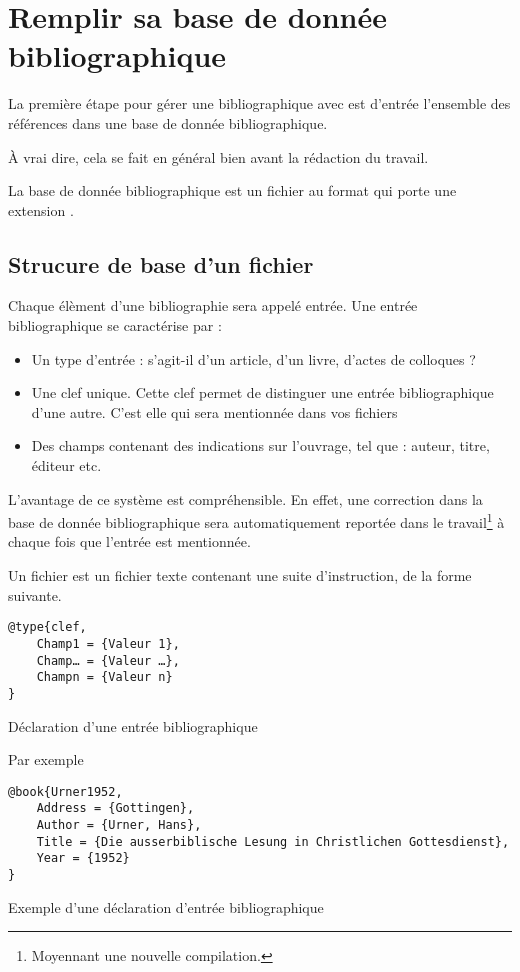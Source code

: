 \chapter{Remplir sa base de donnée bibliographique}

\begin{prealable}
La première étape pour gérer une bibliographique avec \logiciel{\LaTeX} est d'entrée l'ensemble des références dans une base de donnée bibliographique.

À vrai dire, cela se fait en général bien avant la rédaction du travail.

La base de donnée bibliographique est un fichier au format  qui porte une extension .
\end{prealable}

\section{Strucure de base d'un fichier }

Chaque élèment d'une bibliographie sera appelé entrée. Une entrée bibliographique se caractérise par :
\begin{itemize}
\item Un type d'entrée : s'agit-il d'un article, d'un livre, d'actes de colloques ?
\item Une clef unique. Cette clef permet de distinguer une entrée bibliographique d'une autre. C'est elle qui sera mentionnée dans vos fichiers 
\item Des champs contenant des indications sur l'ouvrage, tel que : auteur, titre, éditeur etc. 
\end{itemize}

L'avantage de ce système est compréhensible. En effet, une correction dans la base de donnée bibliographique sera automatiquement reportée dans le travail\footnote{Moyennant une nouvelle compilation.} à chaque fois que l'entrée est mentionnée.

Un fichier  est un fichier texte contenant une suite d'instruction, de la forme suivante.

\begin{listing}
\begin{verbatim}
@type{clef,
	Champ1 = {Valeur 1},
	Champ… = {Valeur …},
	Champn = {Valeur n}
}
\end{verbatim}
\caption{Déclaration d'une entrée bibliographique}
\end{listing}
\begin{listing}
Par exemple
\begin{verbatim}
@book{Urner1952,
	Address = {Gottingen},
	Author = {Urner, Hans},
	Title = {Die ausserbiblische Lesung in Christlichen Gottesdienst},
	Year = {1952}
}
\end{verbatim}
\caption{Exemple d'une déclaration d'entrée bibliographique}
\end{listing}


